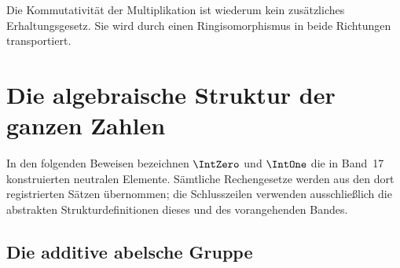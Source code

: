 \documentclass[main.tex]{subfiles}
\begin{document}


Die Kommutativität der Multiplikation ist wiederum kein zusätzliches
Erhaltungsgesetz. Sie wird durch einen Ringisomorphismus in beide Richtungen
transportiert.

\chapter{Die algebraische Struktur der ganzen Zahlen}

In den folgenden Beweisen bezeichnen \(\IntZero\) und
\(\IntOne\) die in Band~17 konstruierten neutralen Elemente. Sämtliche
Rechengesetze werden aus den dort registrierten Sätzen übernommen; die
Schlusszeilen verwenden ausschließlich die abstrakten Strukturdefinitionen
dieses und des vorangehenden Bandes.

\section{Die additive abelsche Gruppe}
\end{document}
